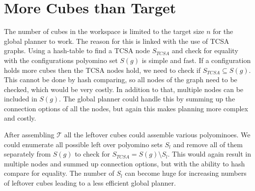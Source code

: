 \section{More Cubes than Target}
\label{sec:more_cubes}

The number of cubes in the workspace is limited to the target size $n$ for the global planner to work.
The reason for this is linked with the use of TCSA graphs. 
Using a hash-table to find a TCSA node $S_\textit{TCSA}$ and check for equality with the configurations polyomino set $S(g)$ is simple and fast.
If a configuration holds more cubes then the TCSA nodes hold, we need to check if $S_\textit{TCSA} \subseteq S(g)$.
This cannot be done by hash comparing, so all nodes of the graph need to be checked, which would be very costly.
In addition to that, multiple nodes can be included in $S(g)$.
The global planner could handle this by summing up the connection options of all the nodes, but again this makes planning more complex and costly.

After assembling $\mathcal{T}$ all the leftover cubes could assemble various polyominoes.
We could enumerate all possible left over polyomino sets $S_l$ and remove all of them separately from $S(g)$ to check for $S_\textit{TCSA} = S(g) \setminus S_l$.
This would again result in multiple nodes and summed up connection options, but with the ability to hash compare for equality.
The number of $S_l$ can become huge for increasing numbers of leftover cubes leading to a less efficient global planner.




